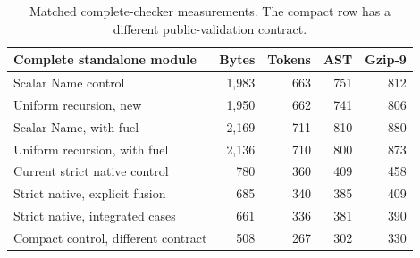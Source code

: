 \begin{table}[ht]
\centering\small
\begin{tabular}{@{}lrrrr@{}}
\toprule
Complete standalone module & Bytes & Tokens & AST & Gzip-9\\
\midrule
Scalar Name control & 1,983 & 663 & 751 & 812\\
Uniform recursion, new & 1,950 & 662 & 741 & 806\\
Scalar Name, with fuel & 2,169 & 711 & 810 & 880\\
Uniform recursion, with fuel & 2,136 & 710 & 800 & 873\\
\midrule
Current strict native control & 780 & 360 & 409 & 458\\
Strict native, explicit fusion & 685 & 340 & 385 & 409\\
Strict native, integrated cases & 661 & 336 & 381 & 390\\
\midrule
Compact control, different contract & 508 & 267 & 302 & 330\\
\bottomrule
\end{tabular}
\caption{Matched complete-checker measurements. The compact row has a different public-validation contract.}
\label{tab:metrics}
\end{table}
